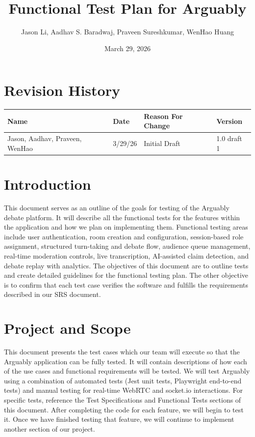 \documentclass[12pt]{article}
\title{Functional Test Plan for Arguably}
\author{Jason Li, Aadhav S. Baradwaj, Praveen Sureshkumar, WenHao Huang}
\date{March 29, 2026}
\begin{document}
\maketitle
\newpage

\tableofcontents
\newpage

\section*{Revision History}

\begin{tabular}{|p{3.5cm}|p{2cm}|p{4.5cm}|p{2.5cm}|}
\hline
\textbf{Name} & \textbf{Date} & \textbf{Reason For Change} & \textbf{Version} \\
\hline
Jason, Aadhav, Praveen, WenHao & 3/29/26 & Initial Draft & 1.0 draft 1 \\
\hline
\end{tabular}

\newpage

\section{Introduction}

This document serves as an outline of the goals for testing of the Arguably debate platform. It will describe all the functional tests for the features within the application and how we plan on implementing them. Functional testing areas include user authentication, room creation and configuration, session-based role assignment, structured turn-taking and debate flow, audience queue management, real-time moderation controls, live transcription, AI-assisted claim detection, and debate replay with analytics. The objectives of this document are to outline tests and create detailed guidelines for the functional testing plan. The other objective is to confirm that each test case verifies the software and fulfills the requirements described in our SRS document.

\section{Project and Scope}

This document presents the test cases which our team will execute so that the Arguably application can be fully tested. It will contain descriptions of how each of the use cases and functional requirements will be tested. We will test Arguably using a combination of automated tests (Jest unit tests, Playwright end-to-end tests) and manual testing for real-time WebRTC and socket.io interactions. For specific tests, reference the Test Specifications and Functional Tests sections of this document. After completing the code for each feature, we will begin to test it. Once we have finished testing that feature, we will continue to implement another section of our project.
\end{document}
